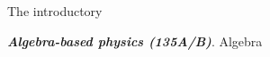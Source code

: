 \documentclass[../../../main.tex]{subfiles}
\begin{document}
The introductory 
\\
\vspace{0.15cm}

\textbf{\textit{Algebra-based physics (135A/B)}}. Algebra
\end{document}
